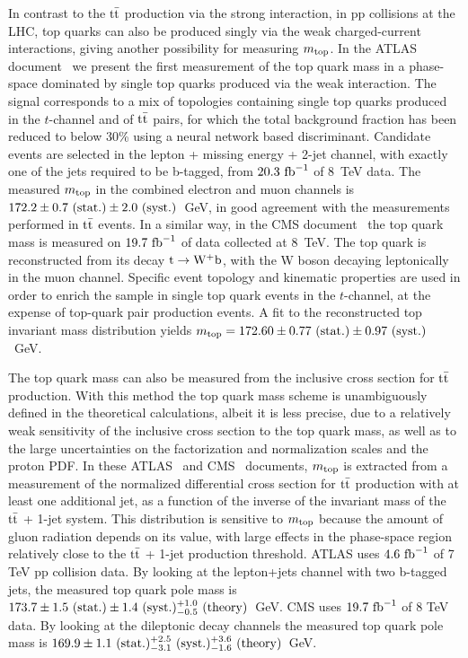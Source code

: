 \documentclass{blois}
\begin{document}
In contrast to the ${\rm t{\bar t}}$ production via the strong
interaction, in pp collisions at the LHC, top quarks can also be produced singly
via the weak charged-current interactions, giving another possibility for
measuring $m_{\rm top}$. In the ATLAS document~\cite{bib:ATLAS-singleTop8TeV}
we present the first measurement of the top quark mass in a phase-space
dominated by single top quarks produced via the weak interaction. The signal
corresponds to a mix of topologies containing single top quarks produced in the
$t$-channel and of ${\rm t{\bar t}}$ pairs, for which the total background
fraction has been reduced to below 30\% using a neural network based discriminant.
Candidate events are selected in the lepton + missing
energy + 2-jet channel, with exactly one of the jets required to be b-tagged,
from $20.3~{\rm fb}^{-1}$ of 8~TeV data.
The measured $m_{\rm top}$ in the combined electron and muon channels is
$172.2 \pm 0.7~({\rm stat.}) \pm 2.0~({\rm syst.})$~GeV, in good agreement
with the measurements performed in ${\rm t{\bar t}}$ events. In a similar way,
in the CMS document~\cite{bib:CMS-singleTop8TeV} the top quark mass is
measured on $19.7~{\rm fb}^{-1}$ of data collected at 8~TeV. The top quark is
reconstructed from its decay ${\rm t\to W^+b}$, with the W boson decaying
leptonically in the muon channel. Specific event topology and kinematic 
properties are used in order to enrich the sample in single top quark events
in the $t$-channel, at the expense of top-quark pair production events. A fit
to the reconstructed top invariant mass distribution yields
$m_{\rm top} = 172.60 \pm 0.77~({\rm stat.}) \pm 0.97~({\rm syst.})$~GeV.

The top quark mass can also be measured from the inclusive cross section for
${\rm t{\bar t}}$ production. With this method the top quark mass scheme is
unambiguously defined in the theoretical calculations, albeit it is less precise,
due to a relatively weak sensitivity of the inclusive cross section to the
top quark mass, as well as to the large uncertainties on the factorization and
normalization scales and the proton PDF. In these
ATLAS~\cite{bib:ATLAS-topPoleMass} and CMS~\cite{bib:CMS-topPoleMass} documents,
$m_{\rm top}$ is extracted from a measurement of the normalized differential
cross section for ${\rm t{\bar t}}$ production with at least one additional
jet, as a function of the inverse of the invariant mass of the
${\rm t{\bar t}}$ + 1-jet system. This distribution is sensitive to
$m_{\rm top}$ because the amount of gluon radiation depends on its value,
with large effects in the phase-space region relatively close to the
${\rm t{\bar t}}$ + 1-jet production threshold. ATLAS uses $4.6~{\rm fb}^{-1}$ of
7 TeV pp collision data. By looking at the lepton+jets channel with two
b-tagged jets, the measured top quark pole mass is
$173.7 \pm 1.5~({\rm stat.}) \pm 1.4~({\rm syst.})^{+1.0}_{-0.5}~({\rm theory})$~GeV.
CMS uses $19.7~{\rm fb}^{-1}$ of 8 TeV data. By looking at the dileptonic decay
channels the measured top quark pole mass is
$169.9 \pm 1.1~({\rm stat.})^{+2.5}_{-3.1}~({\rm syst.})^{+3.6}_{-1.6}~({\rm theory})$~GeV.
\end{document}
